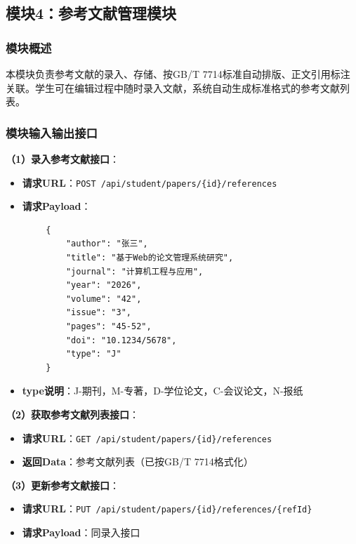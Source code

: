 \documentclass{../template/softeng}
\begin{document}
	\subsection{模块4：参考文献管理模块}

	\subsubsection{模块概述}
	本模块负责参考文献的录入、存储、按GB/T 7714标准自动排版、正文引用标注关联。学生可在编辑过程中随时录入文献，系统自动生成标准格式的参考文献列表。

	\subsubsection{模块输入输出接口}

	\textbf{（1）录入参考文献接口}：
	\begin{itemize}
		\item \textbf{请求URL}：\texttt{POST /api/student/papers/\{id\}/references}
		\item \textbf{请求Payload}：
	\end{itemize}
	\begin{verbatim}
		{
			"author": "张三",
			"title": "基于Web的论文管理系统研究",
			"journal": "计算机工程与应用",
			"year": "2026",
			"volume": "42",
			"issue": "3",
			"pages": "45-52",
			"doi": "10.1234/5678",
			"type": "J"
		}
	\end{verbatim}
	\begin{itemize}
		\item \textbf{type说明}：J-期刊，M-专著，D-学位论文，C-会议论文，N-报纸
	\end{itemize}

	\textbf{（2）获取参考文献列表接口}：
	\begin{itemize}
		\item \textbf{请求URL}：\texttt{GET /api/student/papers/\{id\}/references}
		\item \textbf{返回Data}：参考文献列表（已按GB/T 7714格式化）
	\end{itemize}

	\textbf{（3）更新参考文献接口}：
	\begin{itemize}
		\item \textbf{请求URL}：\texttt{PUT /api/student/papers/\{id\}/references/\{refId\}}
		\item \textbf{请求Payload}：同录入接口
	\end{itemize}
\end{document}
